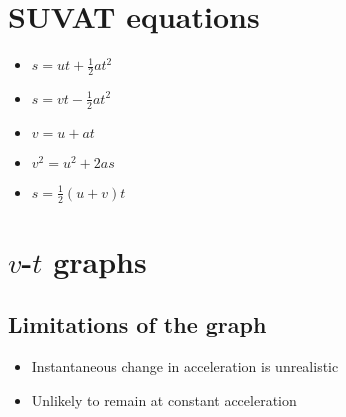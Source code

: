 \section{SUVAT equations}
\begin{itemize}
    \item $s=ut+\frac{1}{2}at^2$
    \item $s=vt-\frac{1}{2}at^2$
    \item $v=u+at$
    \item $v^2=u^2+2as$
    \item $s=\frac{1}{2}(u+v)t$
\end{itemize}

\section{$v$-$t$ graphs}
\subsection{Limitations of the graph}
\begin{itemize}
    \item Instantaneous change in acceleration is unrealistic
    \item Unlikely to remain at constant acceleration
\end{itemize}